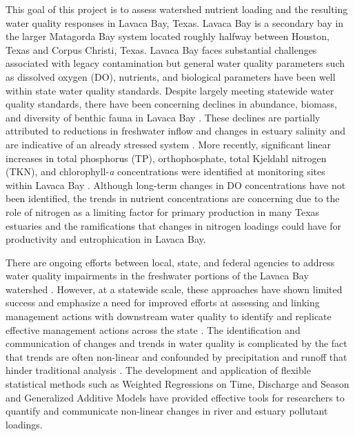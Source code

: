 \documentclass[fleqn,10pt,lineno]{wlpeerj} %
\begin{document}
This goal of this project is to assess watershed nutrient loading and
the resulting water quality responses in Lavaca Bay, Texas. Lavaca Bay
is a secondary bay in the larger Matagorda Bay system located roughly
halfway between Houston, Texas and Corpus Christi, Texas. Lavaca Bay
faces substantial challenges associated with legacy contamination but
general water quality parameters such as dissolved oxygen (DO),
nutrients, and biological parameters have been well within state water
quality standards. Despite largely meeting statewide water quality
standards, there have been concerning declines in abundance, biomass,
and diversity of benthic fauna in Lavaca Bay
\autocite{beserespollackLongtermTrendsResponse2011}. These declines are
partially attributed to reductions in freshwater inflow and changes in
estuary salinity and are indicative of an already stressed system
\autocite{beserespollackLongtermTrendsResponse2011,palmerImpactsDroughtsLow2015,montagnaAssessmentRelationshipFreshwater2020}.
More recently, significant linear increases in total phosphorus (TP),
orthophosphate, total Kjeldahl nitrogen (TKN), and chlorophyll-\emph{a}
concentrations were identified at monitoring sites within Lavaca Bay
\autocite{bugica_water_2020}. Although long-term changes in DO
concentrations have not been identified, the trends in nutrient
concentrations are concerning due to the role of nitrogen as a limiting
factor for primary production in many Texas estuaries
\autocite{gardnerNitrogenFixationDissimilatory2006,houTransformationFateNitrate2012,doradoUnderstandingInteractionsFreshwater2015,paudelRelationshipSuspendedSolids2019,wetz_exceptionally_2017}
and the ramifications that changes in nitrogen loadings could have for
productivity and eutrophication in Lavaca Bay.

There are ongoing efforts between local, state, and federal agencies to
address water quality impairments in the freshwater portions of the
Lavaca Bay watershed
\autocite{jainTechnicalSupportDocument2021,schrammLavacaRiverWatershed2018,bertholdDirectMailingEducation2021}.
However, at a statewide scale, these approaches have shown limited
success and emphasize a need for improved efforts at assessing and
linking management actions with downstream water quality to identify and
replicate effective management actions across the state
\autocite{schrammTotalMaximumDaily2022}. The identification and
communication of changes and trends in water quality is complicated by
the fact that trends are often non-linear and confounded by
precipitation and runoff that hinder traditional analysis
\autocite{wazniakLinkingWaterQuality2007,lloydMethodsDetectingChange2014}.
The development and application of flexible statistical methods such as
Weighted Regressions on Time, Discharge and Season
\autocite[WRTDS,][]{hirschWeightedRegressionsTime2010} and Generalized
Additive Models \autocite[GAMs,][]{woodFastStableRestricted2011} have
provided effective tools for researchers to quantify and communicate
non-linear changes in river and estuary pollutant loadings.
\end{document}
